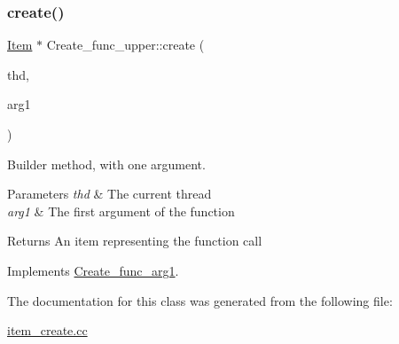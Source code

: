 \subsubsection{\texorpdfstring{create()}{create()}}
{\footnotesize\ttfamily \mbox{\hyperlink{classItem}{Item}} $\ast$ Create\+\_\+func\+\_\+upper\+::create (\begin{DoxyParamCaption}\item[{T\+HD $\ast$}]{thd,  }\item[{\mbox{\hyperlink{classItem}{Item}} $\ast$}]{arg1 }\end{DoxyParamCaption})\hspace{0.3cm}{\ttfamily [virtual]}}

Builder method, with one argument. 
\begin{DoxyParams}{Parameters}
{\em thd} & The current thread \\
\hline
{\em arg1} & The first argument of the function \\
\hline
\end{DoxyParams}
\begin{DoxyReturn}{Returns}
An item representing the function call 
\end{DoxyReturn}


Implements \mbox{\hyperlink{classCreate__func__arg1_a3e9a98f755cd82c3e762e334c955a8c9}{Create\+\_\+func\+\_\+arg1}}.



The documentation for this class was generated from the following file\+:\begin{DoxyCompactItemize}
\item 
\mbox{\hyperlink{item__create_8cc}{item\+\_\+create.\+cc}}\end{DoxyCompactItemize}
